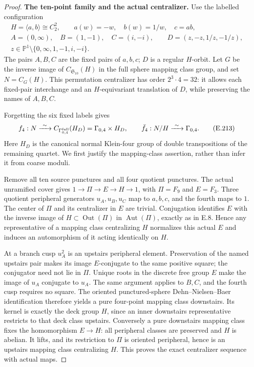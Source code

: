\begin{proof}
\par\medskip\noindent\textbf{The ten-point family and the actual centralizer.}\quad
Use the labelled configuration
\[
\begin{gathered}
 H=\langle a,b\rangle\cong C_2^2,\qquad
 a(w)=-w,\quad b(w)=1/w,\quad c=ab,\\
 A=(0,\infty),\quad B=(1,-1),\quad C=(i,-i),\qquad
 D=(z,-z,1/z,-1/z),\\
 z\in\mathbb P^1\setminus\{0,\infty,1,-1,i,-i\}.
\end{gathered}                                                   \tag{E.212}
\]
The pairs $A,B,C$ are the fixed pairs of $a,b,c$; $D$ is a regular
$H$-orbit.  Let $G$ be the inverse image of
$C_{\mathfrak S_{10}}(H)$ in the full sphere mapping class group,
and set $N=C_G(H)$.  This permutation centralizer has order
$2^3\cdot4=32$: it allows each fixed-pair interchange and an
$H$-equivariant translation of $D$, while preserving the names
of $A,B,C$.

Forgetting the six fixed labels gives
\[
 f_4:N\xrightarrow{\ \sim\ }
 C_{\Gamma_{0,4}^{\rm full}}(H_D)
      =\Gamma_{0,4}\times H_D,\qquad
 \bar f_4:N/H\xrightarrow{\ \sim\ }\Gamma_{0,4}.
                                                               \tag{E.213}
\]
Here $H_D$ is the canonical normal Klein-four group of double
transpositions of the remaining quartet.  We first justify the
mapping-class assertion, rather than infer it from coarse moduli.

Remove all ten source punctures and all four quotient punctures.
The actual unramified cover gives
$1\to\Pi\to E\to H\to1$, with $\Pi=F_9$ and $E=F_3$.
Three quotient peripheral generators $u_A,u_B,u_C$ map to $a,b,c$,
and the fourth maps to $1$.  The center of $\Pi$ and its
centralizer in $E$ are trivial.  Conjugation identifies $E$ with
the inverse image of $H\subset\operatorname{Out}(\Pi)$ in
$\operatorname{Aut}(\Pi)$, exactly as in E.8.
Hence any representative of a mapping class centralizing $H$
normalizes this actual $E$ and induces an automorphism of it
acting identically on $H$.

At a branch cusp $u_A^2$ is an upstairs peripheral element.
Preservation of the named upstairs pair makes its image
$E$-conjugate to the same positive square; the conjugator need
not lie in $\Pi$.  Unique roots in the discrete free group $E$
make the image of $u_A$ conjugate to $u_A$.  The same argument
applies to $B,C$, and the fourth cusp requires no square.
The oriented punctured-sphere Dehn--Nielsen--Baer identification
therefore yields a pure four-point mapping class downstairs.
Its kernel is exactly the deck group $H$, since an inner
downstairs representative restricts to that deck class upstairs.
Conversely a pure downstairs mapping class fixes the homomorphism
$E\to H$: all peripheral classes are preserved and $H$ is
abelian.  It lifts, and its restriction to $\Pi$ is oriented
peripheral, hence is an upstairs mapping class centralizing $H$.
This proves the exact centralizer sequence with actual maps.


\end{proof}
